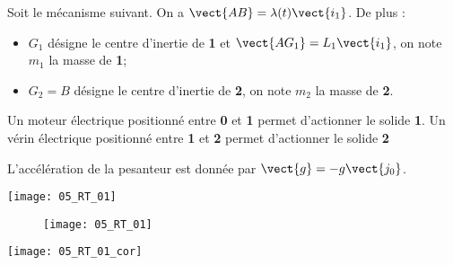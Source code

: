 \normaltrue
\correctiontrue


\setcounter{question}{0}%
\ifcorrection
\else
{}
\fi

\ifprof
\else
Soit le mécanisme suivant. On a $\vect{AB}=\lambda(t)\vect{i_1}$. De plus :
\begin{itemize}
\item $G_1$ désigne le centre d'inertie de \textbf{1} et $\vect{AG_1}=L_1\vect{i_1}$, on note $m_1$ la masse de \textbf{1}; %
\item $G_2=B$ désigne le centre d'inertie de \textbf{2}, on note $m_2$ la masse de \textbf{2}.%
\end{itemize}


Un moteur électrique positionné entre \textbf{0} et \textbf{1} permet d'actionner le solide \textbf{1}.
Un vérin électrique positionné entre \textbf{1} et \textbf{2} permet d'actionner le solide \textbf{2}

L'accélération de la pesanteur est donnée par $\vect{g}=-g\vect{j_0}$.
\fi
\ifprof
\begin{marginfigure}
\texttt{[image: 05\_RT\_01]}
\end{marginfigure}
\else

\begin{figure}[!h]
\centering
\texttt{[image: 05\_RT\_01]}
\end{figure}
\fi


\ifprof
\begin{marginfigure}
\texttt{[image: 05\_RT\_01\_cor]}
\end{marginfigure}

\else
\fi

